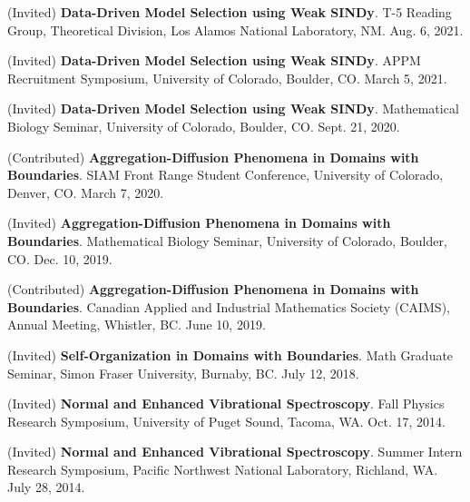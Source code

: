 \documentclass[letterpaper,11pt,oneside]{article}
\begin{document}
\begin{enumerate}[label={[\arabic*]}]
\item (Invited) \textbf{Data-Driven Model Selection using Weak SINDy}. T-5 Reading Group, Theoretical Division, Los Alamos National Laboratory, NM. Aug. 6, 2021.
\item (Invited) \textbf{Data-Driven Model Selection using Weak SINDy}. APPM Recruitment Symposium, University of Colorado, Boulder, CO. March 5, 2021.
\item (Invited) \textbf{Data-Driven Model Selection using Weak SINDy}. Mathematical Biology Seminar, University of Colorado, Boulder, CO. Sept. 21, 2020.
\item (Contributed) \textbf{Aggregation-Diffusion Phenomena in Domains with Boundaries}. SIAM Front Range Student Conference, University of Colorado, Denver, CO. March 7, 2020.
\item (Invited) \textbf{Aggregation-Diffusion Phenomena in Domains with Boundaries}. Mathematical Biology Seminar, University of Colorado, Boulder, CO. Dec. 10, 2019.
\item (Contributed) \textbf{Aggregation-Diffusion Phenomena in Domains with Boundaries}. Canadian Applied and Industrial Mathematics Society (CAIMS), Annual Meeting, Whistler, BC. June 10, 2019.
\item (Invited) \textbf{Self-Organization in Domains with Boundaries}. Math Graduate Seminar, Simon Fraser University, Burnaby, BC. July 12, 2018.
\item (Invited) \textbf{Normal and Enhanced Vibrational Spectroscopy}. Fall Physics Research Symposium, University of Puget Sound, Tacoma, WA. Oct. 17, 2014.
\item (Invited) \textbf{Normal and Enhanced Vibrational Spectroscopy}. Summer Intern Research Symposium, Pacific Northwest National Laboratory, Richland, WA. July 28, 2014.
\end{enumerate}
\end{document}
